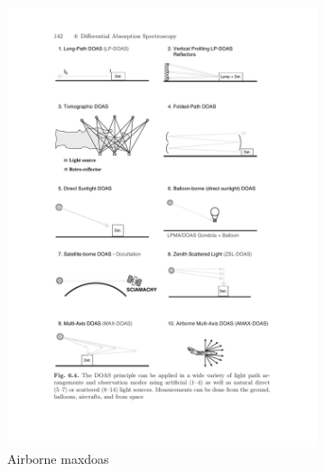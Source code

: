 \begin{figure}[htpb]
\begin{subfigure}[b]{.475\textwidth}
        \includegraphics[trim=10.8cm 5.3cm 4.5cm
        21.7cm, clip, width=\textwidth]{img/pdf/zenithMaxAMax.pdf}
        \caption{Airborne \gls{maxdoas}}
        \label{fig:amaxdoas}
    \end{subfigure}
    \hfill
    \begin{subfigure}[b]{.475\textwidth}
        \centering

\end{subfigure}
\end{figure}
